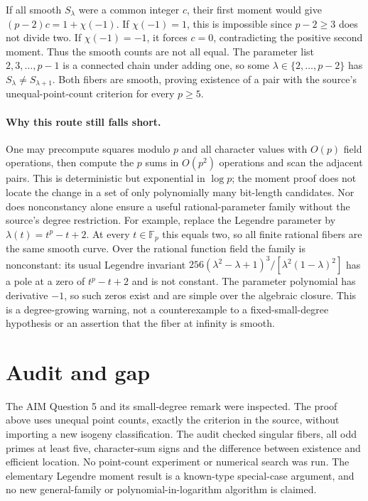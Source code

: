 \documentclass[11pt]{article}
\begin{document}
If all smooth $S_\lambda$ were a common integer $c$, their first
moment would give $(p-2)c=1+\chi(-1)$. If $\chi(-1)=1$, this is
impossible since $p-2\ge3$ does not divide two. If $\chi(-1)=-1$,
it forces $c=0$, contradicting the positive second moment. Thus the
smooth counts are not all equal. The parameter list
$2,3,\ldots,p-1$ is a connected chain under adding one, so some
$\lambda\in\{2,\ldots,p-2\}$ has $S_\lambda\ne S_{\lambda+1}$.
Both fibers are smooth, proving existence of a pair with the source's
unequal-point-count criterion for every $p\ge5$.

\paragraph{Why this route still falls short.}
One may precompute squares modulo $p$ and all character values with
$O(p)$ field operations, then compute the $p$ sums in $O(p^2)$
operations and scan the adjacent pairs. This is deterministic but
exponential in $\log p$; the moment proof does not locate the change
in a set of only polynomially many bit-length candidates.
Nor does nonconstancy alone ensure a useful rational-parameter family
without the source's degree restriction. For example, replace the
Legendre parameter by $\lambda(t)=t^p-t+2$. At every $t\in\mathbb F_p$
this equals two, so all finite rational fibers are the same smooth
curve. Over the rational function field the family is nonconstant:
its usual Legendre invariant
$256(\lambda^2-\lambda+1)^3/[\lambda^2(1-\lambda)^2]$ has a pole
at a zero of $t^p-t+2$ and is not constant. The parameter polynomial
has derivative $-1$, so such zeros exist and are simple over the
algebraic closure. This is a degree-growing warning, not a
counterexample to a fixed-small-degree hypothesis or an assertion that
the fiber at infinity is smooth.

\section{Audit and gap}
The AIM Question 5 and its small-degree remark were inspected. The
proof above uses unequal point counts, exactly the criterion in the
source, without importing a new isogeny classification. The audit
checked singular fibers, all odd primes at least five, character-sum
signs and the difference between existence and efficient location.
No point-count experiment or numerical search was run. The elementary
Legendre moment result is a known-type special-case argument, and no
new general-family or polynomial-in-logarithm algorithm is claimed.
\end{document}
